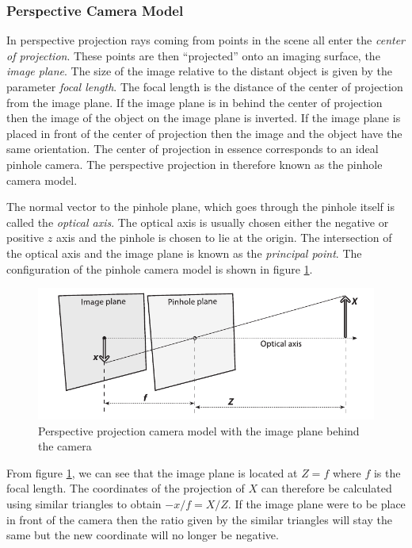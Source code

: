 \documentclass[11pt,a4paper]{report}
\begin{document}
\subsubsection{Perspective Camera Model}
In perspective projection rays coming from points in the scene all enter the \textit{center of
projection}. These points are then ``projected'' onto an imaging surface, the
\textit{image plane}. The size of the image relative to the distant object is given by
the parameter \textit{focal length}. The focal length is the distance of the
center of projection from the image plane. If the image plane is in behind the
center of projection then the image of the object on the image plane is
inverted. If the image plane is placed in front of the center of projection then the image and
the object have the same orientation. The center of projection in essence
corresponds to an ideal pinhole camera. The perspective projection in therefore known as the
pinhole camera model. 

The normal vector to the pinhole plane, which goes through the pinhole itself is
called the \textit{optical axis}. The optical axis is usually chosen either the
negative or positive $z$ axis and the pinhole is chosen to lie at the origin. The intersection of the optical axis and the
image plane is known as the \textit{principal point}. The configuration of the
pinhole camera model is shown in figure \ref{fg:pin}.
\begin{figure}[H] 
\centering
\includegraphics[scale=0.75]{images/pinhole.png}
\caption{Perspective projection camera model with the image plane behind the camera}
\label{fg:pin}
\end{figure}

From figure \ref{fg:pin}, we can see that the image plane is located at $Z=f$
where $f$ is the focal length. The coordinates of the projection of $X$ can
therefore be calculated using similar triangles to obtain $-x/f = X/Z$.
If the image plane were to be place in front of the camera then the ratio given
by the similar triangles will stay the same but the new coordinate will no
longer be negative.
\end{document}
